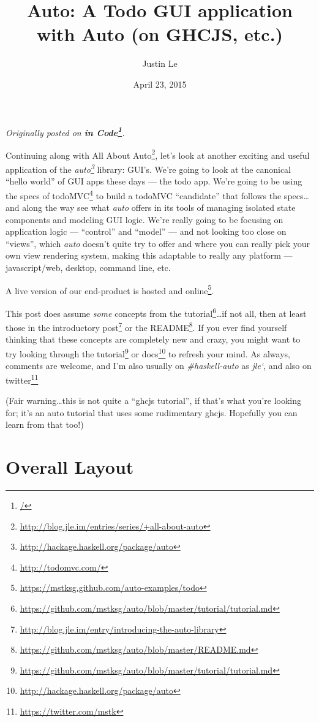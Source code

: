 \documentclass[]{article}
\title{Auto: A Todo GUI application with Auto (on GHCJS, etc.)}
\author{Justin Le}
\date{April 23, 2015}
\renewcommand{\href}[2]{#2\footnote{\url{#1}}}
\begin{document}
\maketitle

\emph{Originally posted on \textbf{\href{/}{in Code}}.}

Continuing along with
\href{http://blog.jle.im/entries/series/+all-about-auto}{All About
Auto}, let's look at another exciting and useful application of the
\emph{\href{http://hackage.haskell.org/package/auto}{auto}} library:
GUI's. We're going to look at the canonical ``hello world'' of GUI apps
these days --- the todo app. We're going to be using the specs of
\href{http://todomvc.com/}{todoMVC} to build a todoMVC ``candidate''
that follows the specs\ldots{}and along the way see what \emph{auto}
offers in its tools of managing isolated state components and modeling
GUI logic. We're really going to be focusing on application logic ---
``control'' and ``model'' --- and not looking too close on ``views'',
which \emph{auto} doesn't quite try to offer and where you can really
pick your own view rendering system, making this adaptable to really any
platform --- javascript/web, desktop, command line, etc.

A live version of our end-product
\href{https://mstksg.github.com/auto-examples/todo}{is hosted and
online}.

This post does assume \emph{some} concepts from the
\href{https://github.com/mstksg/auto/blob/master/tutorial/tutorial.md}{tutorial}\ldots{}if
not all, then at least those in the
\href{http://blog.jle.im/entry/introducing-the-auto-library}{introductory
post} or the
\href{https://github.com/mstksg/auto/blob/master/README.md}{README}. If
you ever find yourself thinking that these concepts are completely new
and crazy, you might want to try looking through the
\href{https://github.com/mstksg/auto/blob/master/tutorial/tutorial.md}{tutorial}
or \href{http://hackage.haskell.org/package/auto}{docs} to refresh your
mind. As always, comments are welcome, and I'm also usually on
\emph{\#haskell-auto} as \emph{jle`}, and also on
\href{https://twitter.com/mstk}{twitter}

(Fair warning\ldots{}this is not quite a ``ghcjs tutorial'', if that's
what you're looking for; it's an auto tutorial that uses some
rudimentary ghcjs. Hopefully you can learn from that too!)

\section{Overall Layout}\label{overall-layout}
\end{document}
